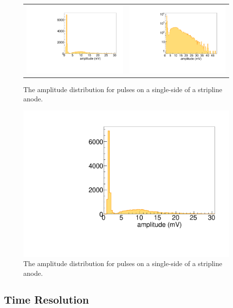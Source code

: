 \documentclass[preprint,12pt]{elsarticle}
\begin{document}
\begin{figure}
	\centering
        \begin{tabular}{l l}
                \includegraphics[width=0.52\linewidth]{plots/Amplitudes_notlog} &
                \includegraphics[width=0.53\linewidth]{plots/Amplitudes}\\
         \end{tabular}  
       \caption{The amplitude distribution for pulses on a single-side of a stripline anode.}
	\label{fig:amp}
\end{figure}

\begin{figure}
	\centering
       \includegraphics[width=0.52\linewidth]{plots/Amplitudes_notlog}  
       \caption{The amplitude distribution for pulses on a single-side of a stripline anode.}
	\label{fig:amp}
\end{figure}


\subsection{Time Resolution}
\end{document}
